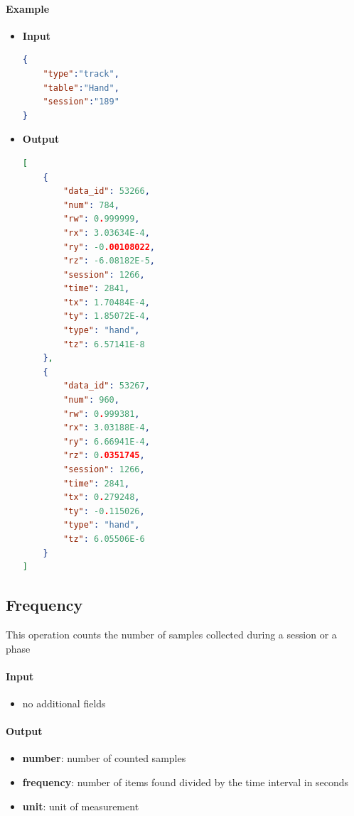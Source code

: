 \documentclass[a4paper,notitlepage,onecolumn]{hitec}  %
\begin{document}
\paragraph{Example}
\begin{itemize}
\item\textbf{Input}
\begin{lstlisting}[language=json,firstnumber=1]
{  
	"type":"track",
	"table":"Hand",
	"session":"189"
}
\end{lstlisting}
\item\textbf{Output}
\begin{lstlisting}[language=json,firstnumber=1]
[  
	{
		"data_id": 53266,
		"num": 784,
		"rw": 0.999999,
		"rx": 3.03634E-4,
		"ry": -0.00108022,
		"rz": -6.08182E-5,
		"session": 1266,
		"time": 2841,
		"tx": 1.70484E-4,
		"ty": 1.85072E-4,
		"type": "hand",
		"tz": 6.57141E-8
	},
	{
		"data_id": 53267,
		"num": 960,
		"rw": 0.999381,
		"rx": 3.03188E-4,
		"ry": 6.66941E-4,
		"rz": 0.0351745,
		"session": 1266,
		"time": 2841,
		"tx": 0.279248,
		"ty": -0.115026,
		"type": "hand",
		"tz": 6.05506E-6
	}
]
\end{lstlisting}
\end{itemize}

\subsection{Frequency}
This operation counts the number of samples collected during a session or a phase

\paragraph{Input}
\begin{itemize}
\item no additional fields
\end{itemize}

\paragraph{Output}
\begin{itemize}
\item\textbf{number}: number of counted samples
\item\textbf{frequency}: number of items found divided by the time interval in seconds
\item\textbf{unit}: unit of measurement
\end{itemize}
\end{document}
